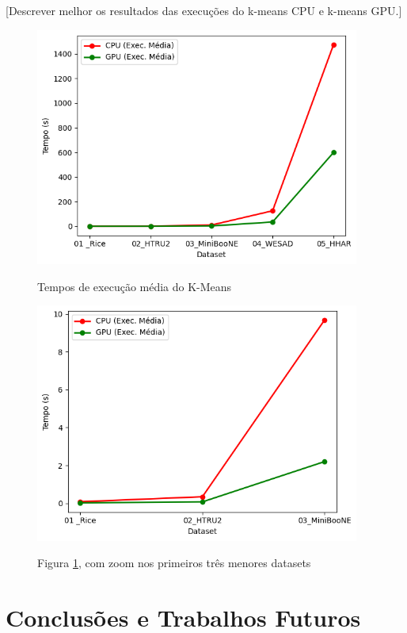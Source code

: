 \documentclass[12pt, %
openright, 
oneside, %
a4paper,    %
brazil]{facom-ufu-abntex2}
\begin{document}
[Descrever melhor os resultados das execuções do k-means CPU e k-means GPU.]

\begin{figure}[h]
  \caption{Tempos de execução média do K-Means}
  \centering
  \includegraphics[width=0.95\textwidth]{kMeansResultsAvg.png}
  \label{fig:kMeansAvg}
\end{figure}

\begin{figure}[h]
  \caption{Figura \ref{fig:kMeansAvg}, com zoom nos primeiros três menores datasets}
  \centering
  \includegraphics[width=0.95\textwidth]{kMeansResultsAvgZoomed.png}
  \label{fig:kMeansAvgZoomed}
\end{figure}





\chapter{Conclusões e Trabalhos Futuros}
\end{document}
